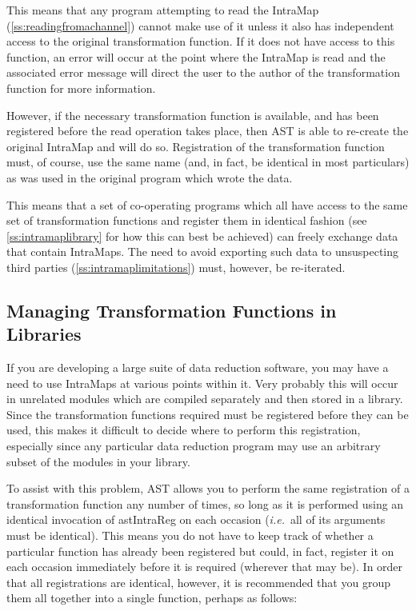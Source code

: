 \documentclass[twoside,11pt]{article}
\newcommand{\htmlref}[2]{#1}
\newcommand{\secref}[1]{\S\ref{#1}}
\renewcommand{\secref}[1]{\ref{#1}}
\begin{document}
This means that any program attempting to read the IntraMap
(\secref{ss:readingfromachannel}) cannot make use of it unless it also
has independent access to the original transformation function. If it
does not have access to this function, an error will occur at the
point where the IntraMap is read and the associated error message will
direct the user to the author of the transformation function for more
information.

However, if the necessary transformation function is available, and
has been registered before the read operation takes place, then AST is
able to re-create the original IntraMap and will do so. Registration
of the transformation function must, of course, use the same name
(and, in fact, be identical in most particulars) as was used in the
original program which wrote the data.

This means that a set of co-operating programs which all have access
to the same set of transformation functions and register them in
identical fashion (see \secref{ss:intramaplibrary} for how this can
best be achieved) can freely exchange data that contain IntraMaps. The
need to avoid exporting such data to unsuspecting third parties
(\secref{ss:intramaplimitations}) must, however, be re-iterated.

\subsection{\label{ss:intramaplibrary}Managing Transformation Functions in Libraries}

If you are developing a large suite of data reduction software, you
may have a need to use IntraMaps at various points within it. Very
probably this will occur in unrelated modules which are compiled
separately and then stored in a library. Since the transformation
functions required must be registered before they can be used, this
makes it difficult to decide where to perform this registration,
especially since any particular data reduction program may use an
arbitrary subset of the modules in your library.

To assist with this problem, AST allows you to perform the same
registration of a transformation function any number of times, so long
as it is performed using an identical invocation of \htmlref{astIntraReg}{astIntraReg} on
each occasion ({\em{i.e.}}\ all of its arguments must be
identical). This means you do not have to keep track of whether a
particular function has already been registered but could, in fact,
register it on each occasion immediately before it is required
(wherever that may be). In order that all registrations are identical,
however, it is recommended that you group them all together into a
single function, perhaps as follows:
\end{document}
